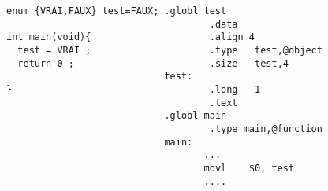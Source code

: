 \begin{frame}[fragile]
\begin{verbatim}
enum {VRAI,FAUX} test=FAUX; .globl test                                                       
                                    .data                                                     
int main(void){                     .align 4                                                  
  test = VRAI ;                     .type   test,@object                                      
  return 0 ;                        .size   test,4                                            
                            test:                                                             
}                                   .long   1                                                 
                                    .text                                                     
                            .globl main                                                       
                                    .type main,@function               
                            main:                                      
                                   ...
                                   movl    $0, test
                                   ....
\end{verbatim}

\end{frame}
